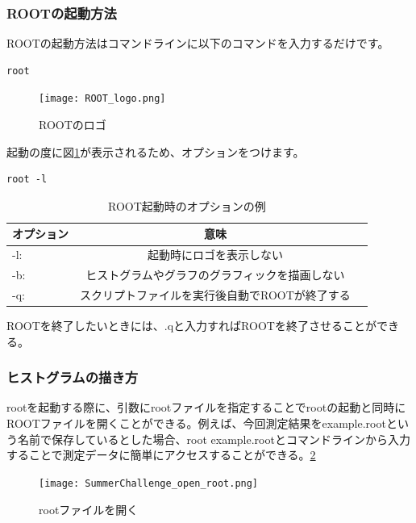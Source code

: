 \documentclass[uplatex,10pt,a4j]{jsarticle}
\begin{document}
\subsubsection{ROOTの起動方法}
ROOTの起動方法はコマンドラインに以下のコマンドを入力するだけです。
\begin{lstlisting}
root
\end{lstlisting}
\begin{figure}[ht]
  \begin{center}
    \texttt{[image: ROOT\_logo.png]}
    \caption{ROOTのロゴ}
    \label{fig:ROOT_logo}
  \end{center}
\end{figure}
起動の度に図\ref{fig:ROOT_logo}が表示されるため、オプションをつけます。
\begin{lstlisting}
root -l
\end{lstlisting}
\begin{table}[ht]
  \caption{ROOT起動時のオプションの例}
  \centering
  \begin{tabular}{lcr}
    \hline
    オプション & 意味                                           \\
    \hline \hline
    -l:        & 起動時にロゴを表示しない                       \\
    -b:        & ヒストグラムやグラフのグラフィックを描画しない \\
    -q:        & スクリプトファイルを実行後自動でROOTが終了する \\
    \hline
  \end{tabular}
\end{table}
ROOTを終了したいときには、.qと入力すればROOTを終了させることができる。

\subsubsection{ヒストグラムの描き方}
rootを起動する際に、引数にrootファイルを指定することでrootの起動と同時にROOTファイルを開くことができる。例えば、今回測定結果をexample.rootという名前で保存しているとした場合、root example.rootとコマンドラインから入力することで測定データに簡単にアクセスすることができる。\ref{fig:open_ROOT}
\begin{figure}[h]
  \begin{center}
    \texttt{[image: SummerChallenge\_open\_root.png]}
    \caption{rootファイルを開く}
    \label{fig:open_ROOT}
  \end{center}
\end{figure}
\end{document}
